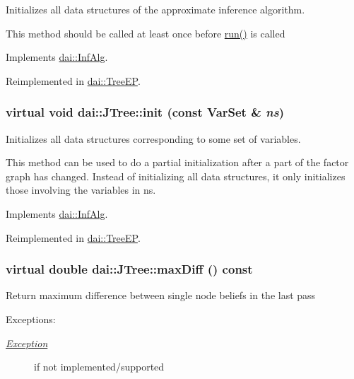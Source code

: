 Initializes all data structures of the approximate inference algorithm. 

This method should be called at least once before \hyperlink{classdai_1_1JTree_b0cd2ba167212e4c8c8d241b985d3db6}{run()} is called 

Implements \hyperlink{classdai_1_1InfAlg_99dd53d1aaccf09a4b977a49a983cc85}{dai::InfAlg}.

Reimplemented in \hyperlink{classdai_1_1TreeEP_fff5580fa87ce391223a2e2867527248}{dai::TreeEP}.\hypertarget{classdai_1_1JTree_365c52b5f264c844ac5c010026719350}{
\subsubsection[init]{\setlength{\rightskip}{0pt plus 5cm}virtual void dai::JTree::init (const {\bf VarSet} \& {\em ns})}}
\label{classdai_1_1JTree_365c52b5f264c844ac5c010026719350}


Initializes all data structures corresponding to some set of variables. 

This method can be used to do a partial initialization after a part of the factor graph has changed. Instead of initializing all data structures, it only initializes those involving the variables in ns. 

Implements \hyperlink{classdai_1_1InfAlg_7d006e89e01a2f3e2a40b0f7f6e37ae5}{dai::InfAlg}.

Reimplemented in \hyperlink{classdai_1_1TreeEP_3cc3718d1fbdf67db23a846283f99d08}{dai::TreeEP}.\hypertarget{classdai_1_1JTree_acd3916835c9d349aa1b22a2dd54de83}{
\subsubsection[maxDiff]{\setlength{\rightskip}{0pt plus 5cm}virtual double dai::JTree::maxDiff () const}}
\label{classdai_1_1JTree_acd3916835c9d349aa1b22a2dd54de83}


Return maximum difference between single node beliefs in the last pass \begin{Desc}
\item[Exceptions:]
\begin{description}
\item[{\em \hyperlink{classdai_1_1Exception}{Exception}}]if not implemented/supported \end{description}
\end{Desc}


